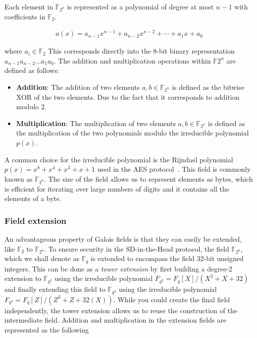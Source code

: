 \documentclass[twoside,11pt]{report}
\theoremstyle{definition}
\theoremstyle{plain}
\begin{document}
Each element in $\mathbb{F}_{2^n}$ is represented as a polynomial of degree at most $n-1$ with coefficients in $\mathbb{F}_2$.

\begin{align*}
  a(x) = a_{n-1}x^{n-1} + a_{n-2}x^{n-2} + \cdots + a_1x + a_0
\end{align*}

\noindent
where $a_i \in \mathbb{F}_2$ This corresponds directly into the 8-bit binary representation $a_{n-1}a_{n-2}\dots a_1a_0$. The addition and multiplication operations within $\mathbb{F}{2^n}$ are defined as follows:

\begin{itemize}
  \item \textbf{Addition}: The addition of two elements $a,b \in \mathbb{F}_{2^n}$ is defined as the bitwise XOR of the two elements. Due to the fact that it corresponds to addition modulo $2$.
  \item \textbf{Multiplication}: The multiplication of two elements $a,b \in \mathbb{F}_{2^n}$ is defined as the multiplication of the two polynomials modulo the irreducible polynomial $p(x)$.
\end{itemize}

A common choice for the irreducible polynomial is the Rijndael polynomial $p(x) = x^8 + x^4 + x^3 + x + 1$ used in the AES protocol~\cite{brownadvanced}. This field is commonly known as $\mathbb{F}_{2^8}$. The size of the field allows us to represent elements as bytes, which is efficient for iterating over large numbers of digits and it contains all the elements of a byte.

\subsubsection{Field extension}\label{sub:field_extension}

An advantageous property of Galois fields is that they can easily be extended, like $\mathbb{F}_{2}$ to $\mathbb{F}_{2^8}$. To ensure security in the SD-in-the-Head protocol, the field $\mathbb{F}_{2^8}$, which we shall denote as $\mathbb{F}_q$ is extended to encompass the field 32-bit unsigned integers. This can be done as a \textit{tower extension} by first building a degree-2 extension to $\mathbb{F}_{q^2}$ using the irreducible polynomial $F_{q^2} = F_q[X] / (X^2 + X + 32)$ and finally extending this field to $\mathbb{F}_{q^4}$ using the irreducible polynomial $F_{q^4} = F_q[Z] / (Z^2 + Z + 32(X))$. While you could create the final field independently, the tower extension allows us to reuse the construction of the intermediate field. Addition and multiplication in the extension fields are represented as the following
\end{document}
